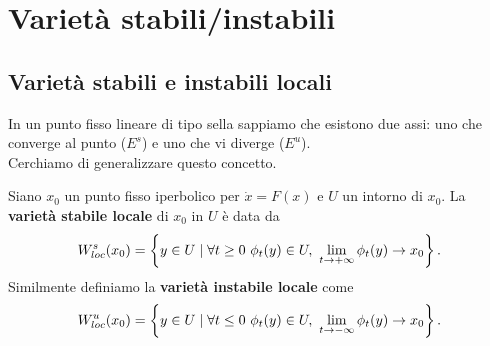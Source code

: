 \chapter{Variet\`a stabili/instabili}

\section{Variet\`a stabili e instabili locali}
In un punto fisso lineare di tipo sella sappiamo che esistono due assi: uno che converge al punto ($E^s$) e uno che vi diverge ($E^u$).\\
Cerchiamo di generalizzare questo concetto.

\begin{definition}
Siano $x_0$ un punto fisso iperbolico per $\dot x=F(x)$ e $U$ un intorno di $x_0$. La \textbf{variet\`a stabile locale} di $x_0$ in $U$ \`e data da
\[W^s_{loc}(x_0)=\left\{{y\in U\mid \forall t\geq 0\ \phi_t(y)\in U,\ \lim_{t\to+\infty}\phi_t(y)\to x_0}\right\}.\]
Similmente definiamo la \textbf{variet\`a instabile locale} come
\[W^{u}_{loc}(x_0)=\cpa{y\in U\mid \forall t\leq 0\ \phi_t(y)\in U,\ \lim_{t\to-\infty}\phi_t(y)\to x_0}.\]
\end{definition}


